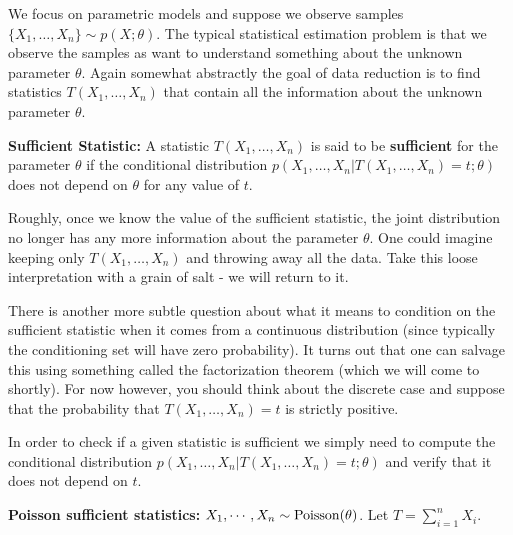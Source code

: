 \documentclass[twoside,12pt]{article}
\begin{document}
We focus on parametric models and suppose we observe samples $\{X_1,\ldots,X_n\} \sim p(X; \theta).$ The typical statistical estimation problem is that we observe the samples as want to understand something about the unknown parameter $\theta$. Again somewhat abstractly the goal of data reduction is to find statistics $T(X_1,\ldots,X_n)$ that contain all the information about the unknown parameter $\theta$.

{\bf Sufficient Statistic: } A statistic $T(X_1,\ldots,X_n)$ is said to be {\bf sufficient} for the parameter $\theta$ if the conditional distribution $p(X_1,\ldots,X_n | T(X_1,\ldots,X_n) =t ; \theta)$ does not depend on $\theta$ for any value of $t$.

Roughly, once we know the value of the sufficient statistic, the joint distribution no longer has any more information about the parameter $\theta$. One could imagine keeping only $T(X_1,\ldots,X_n)$ and throwing away all the data. Take this loose interpretation with a grain of salt - we will return to it.

There is another more subtle question about what it means to condition on the sufficient statistic when it comes from a continuous distribution (since typically the conditioning set will have zero probability). It turns out that one can salvage this using something called the factorization theorem (which we will come to shortly). For now however, you should think about the discrete case and suppose that the probability that $T(X_1,\ldots,X_n) =t$ is strictly positive.

In order to check if a given statistic is sufficient we simply need to compute the conditional distribution 
$p(X_1,\ldots,X_n | T(X_1,\ldots,X_n) =t ; \theta)$ and verify that it does not depend on $t$.

{\bf Poisson sufficient statistics: } $X_1, \cdots, X_n \sim {\rm Poisson}(\theta)$.
Let $T = \sum_{i=1}^n X_i$.
\end{document}
